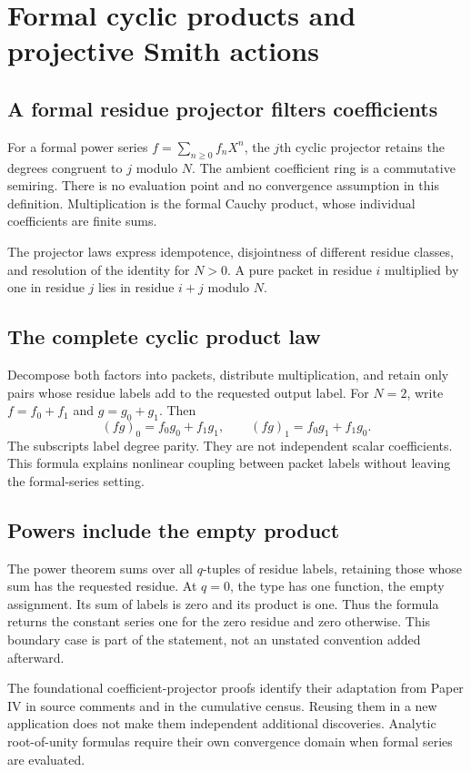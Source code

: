 \section{Formal cyclic products and projective Smith actions}
\subsection{A formal residue projector filters coefficients}
For a formal power series $f=\sum_{n\ge0}f_nX^n$, the $j$th cyclic projector retains the degrees congruent to $j$ modulo $N$.
The ambient coefficient ring is a commutative semiring. There is no evaluation point and no convergence assumption in this definition. Multiplication is the formal Cauchy product, whose individual coefficients are finite sums.

The projector laws express idempotence, disjointness of different residue classes, and resolution of the identity for $N>0$. A pure packet in residue $i$ multiplied by one in residue $j$ lies in residue $i+j$ modulo $N$.

\subsection{The complete cyclic product law}
Decompose both factors into packets, distribute multiplication, and retain only pairs whose residue labels add to the requested output label.
For $N=2$, write $f=f_0+f_1$ and $g=g_0+g_1$. Then
\[
(fg)_0=f_0g_0+f_1g_1,\qquad (fg)_1=f_0g_1+f_1g_0.
\]
The subscripts label degree parity. They are not independent scalar coefficients. This formula explains nonlinear coupling between packet labels without leaving the formal-series setting.

\subsection{Powers include the empty product}
The power theorem sums over all $q$-tuples of residue labels, retaining those whose sum has the requested residue.
At $q=0$, the type  has one function, the empty assignment. Its sum of labels is zero and its product is one. Thus the formula returns the constant series one for the zero residue and zero otherwise. This boundary case is part of the statement, not an unstated convention added afterward.

The foundational coefficient-projector proofs identify their adaptation from Paper IV in source comments and in the cumulative census. Reusing them in a new application does not make them independent additional discoveries. Analytic root-of-unity formulas require their own convergence domain when formal series are evaluated.

